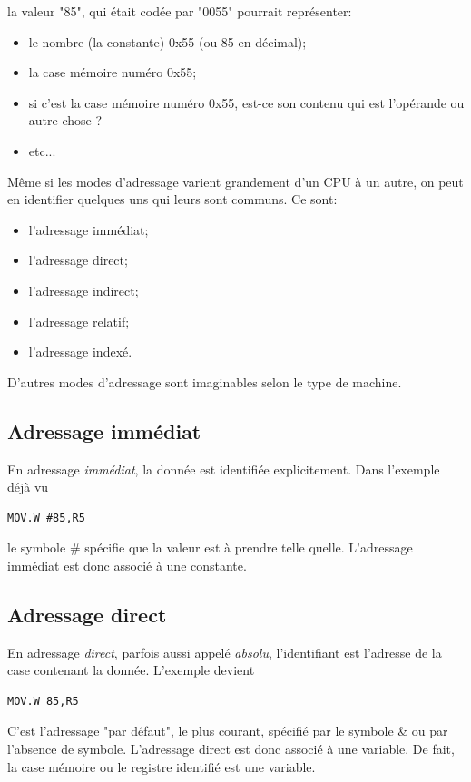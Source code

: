 la valeur "85", qui était codée par "0055" pourrait représenter:
\begin{itemize}[label=\textbullet,font=\small]
\item le nombre (la constante) 0x55 (ou 85 en décimal);
\item la case mémoire numéro 0x55;
\item si c'est la case mémoire numéro 0x55, est-ce son contenu qui est l'opérande ou autre chose ?
\item etc...
\end{itemize}

Même si les modes d'adressage varient grandement d'un CPU à un autre, on peut en identifier quelques uns qui leurs sont communs. Ce sont:
\begin{itemize}[label=\textbullet,font=\small]
\item l'adressage immédiat;
\item l'adressage direct;
\item l'adressage indirect;
\item l'adressage relatif;
\item l'adressage indexé.
\end{itemize}

D'autres modes d'adressage sont imaginables selon le type de machine.

\subsection{Adressage immédiat}
En adressage \textit{immédiat}, la donnée est identifiée explicitement. Dans l'exemple déjà vu 
\lstset{style=customc}
\begin{lstlisting}
MOV.W #85,R5
\end{lstlisting}

le symbole \# spécifie que la valeur est à prendre telle quelle.
L'adressage immédiat est donc associé à une constante.

\subsection{Adressage direct}
En adressage \textit{direct}, parfois aussi appelé \textit{absolu}, l'identifiant est l'adresse de la case contenant la donnée. L'exemple devient
\lstset{style=customc}
\begin{lstlisting}
MOV.W 85,R5
\end{lstlisting}
C'est l'adressage "par défaut", le plus courant, spécifié par le symbole \& ou par l'absence de symbole. L'adressage direct est donc associé à une variable. De fait, la case mémoire ou le registre identifié est une variable.


